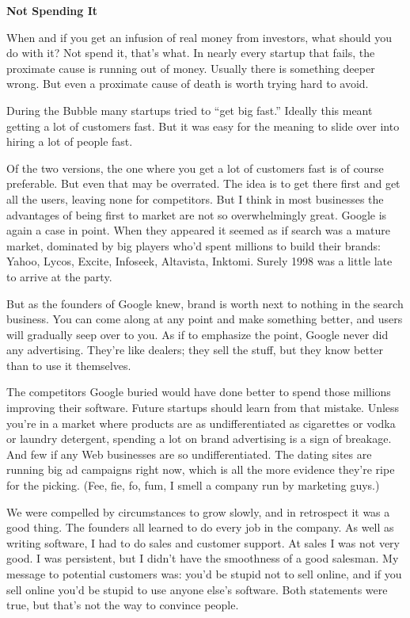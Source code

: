 \documentclass[12pt]{book}
\begin{document}
\textbf{Not Spending It}

When and if you get an infusion of real money from investors, what
should you do with it? Not spend it, that's what. In nearly every
startup that fails, the proximate cause is running out of money. Usually
there is something deeper wrong. But even a proximate cause of death is
worth trying hard to avoid.

During the Bubble many startups tried to ``get big fast.'' Ideally this
meant getting a lot of customers fast. But it was easy for the meaning
to slide over into hiring a lot of people fast.

Of the two versions, the one where you get a lot of customers fast is of
course preferable. But even that may be overrated. The idea is to get
there first and get all the users, leaving none for competitors. But I
think in most businesses the advantages of being first to market are not
so overwhelmingly great. Google is again a case in point. When they
appeared it seemed as if search was a mature market, dominated by big
players who'd spent millions to build their brands: Yahoo, Lycos,
Excite, Infoseek, Altavista, Inktomi. Surely 1998 was a little late to
arrive at the party.

But as the founders of Google knew, brand is worth next to nothing in
the search business. You can come along at any point and make something
better, and users will gradually seep over to you. As if to emphasize
the point, Google never did any advertising. They're like dealers; they
sell the stuff, but they know better than to use it themselves.

The competitors Google buried would have done better to spend those
millions improving their software. Future startups should learn from
that mistake. Unless you're in a market where products are as
undifferentiated as cigarettes or vodka or laundry detergent, spending a
lot on brand advertising is a sign of breakage. And few if any Web
businesses are so undifferentiated. The dating sites are running big ad
campaigns right now, which is all the more evidence they're ripe for the
picking. (Fee, fie, fo, fum, I smell a company run by marketing guys.)

We were compelled by circumstances to grow slowly, and in retrospect it
was a good thing. The founders all learned to do every job in the
company. As well as writing software, I had to do sales and customer
support. At sales I was not very good. I was persistent, but I didn't
have the smoothness of a good salesman. My message to potential
customers was: you'd be stupid not to sell online, and if you sell
online you'd be stupid to use anyone else's software. Both statements
were true, but that's not the way to convince people.
\end{document}
